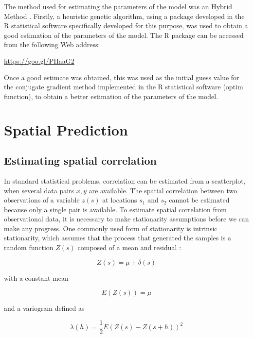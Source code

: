 \documentclass[11pt,twoside]{rmta2010eng}%
\begin{document}
The method used for estimating the parameters of the model was an Hybrid Method \cite{McNelis2005}. Firstly, a heuristic genetic algorithm, using a package developed in the R statistical software \cite{rproject} specifically developed for this purpose, was used to obtain a good estimation of the parameters of the model. The R package can be accessed from the following Web address:
 
\url{https://goo.gl/PHaaG2}

Once a good estimate was obtained, this was used as the initial guess value for the conjugate gradient method implemented in the R statistical software (optim function), to obtain a better estimation of the parameters of the model.


\section{Spatial Prediction}

\subsection*{Estimating spatial correlation}

In standard statistical problems, correlation can be estimated from a scatterplot, when several data pairs ${x, y}$ are available. The spatial correlation between two observations of a variable $z(s)$ at locations $s_{1}$ and $s_{2}$ cannot be estimated because only a single pair is available. To estimate spatial correlation
from observational data, it is necessary to make stationarity assumptions
before we can make any progress. One commonly used form of stationarity
is intrinsic stationarity, which assumes that the process that generated the
samples is a random function $Z(s)$ composed of a mean and residual \cite{bivand2008applied}:

\begin{equation}
Z(s) = \mu + \delta(s)
\end{equation}

with a constant mean 

\begin{equation}
E\left(Z(s)\right) = \mu
\end{equation}

and a variogram defined as 

\begin{equation}
\lambda(h) = \frac{1}{2}E\left(Z(s) - Z(s+h)\right)^{2}
\end{equation}
\end{document}
